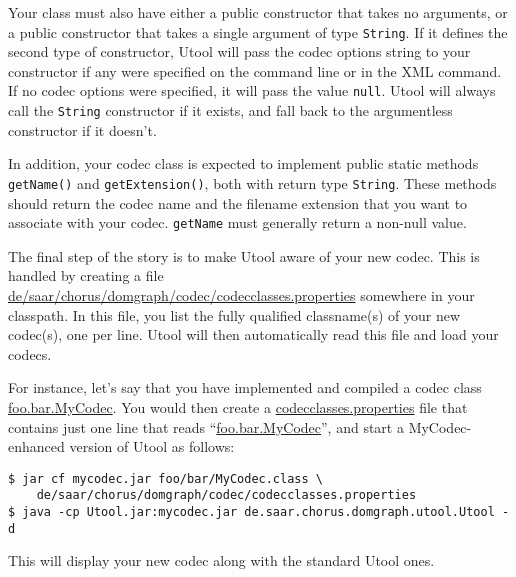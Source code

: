 Your class must also have either a public constructor that takes no
arguments, or a public constructor that takes a single argument of
type \verb?String?. If it defines the second type of constructor,
Utool will pass the codec options string to your constructor if any
were specified on the command line or in the XML command. If no codec
options were specified, it will pass the value \verb?null?. Utool will
always call the \verb?String? constructor if it exists, and fall back
to the argumentless constructor if it doesn't.

In addition, your codec class is expected to implement public static
methods \verb?getName()? and \verb?getExtension()?, both with return
type \verb?String?.  These methods should return the codec name and
the filename extension that you want to associate with your
codec. \verb?getName? must generally return a non-null value.

The final step of the story is to make Utool aware of your new
codec. This is handled by creating a file
\url{de/saar/chorus/domgraph/codec/codecclasses.properties} somewhere
in your classpath. In this file, you list the fully qualified
classname(s) of your new codec(s), one per line. Utool will then
automatically read this file and load your codecs.

For instance, let's say that you have implemented and compiled a codec
class \url{foo.bar.MyCodec}. You would then create a
\url{codecclasses.properties} file that contains just one line that
reads ``\url{foo.bar.MyCodec}'', and start a MyCodec-enhanced version
of Utool as follows:


\begin{verbatim}
$ jar cf mycodec.jar foo/bar/MyCodec.class \
    de/saar/chorus/domgraph/codec/codecclasses.properties
$ java -cp Utool.jar:mycodec.jar de.saar.chorus.domgraph.utool.Utool -d
\end{verbatim}

This will display your new codec along with the standard Utool ones.








